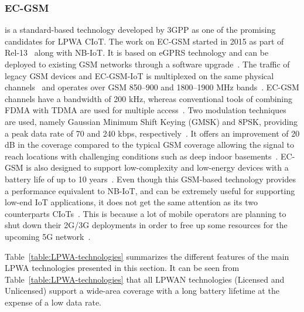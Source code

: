 \documentclass[]{IEEEtran}
\begin{document}
\subsubsection{EC-GSM}
\label{sec:2-2-3}
is a standard-based technology developed by 3GPP as one of the promising candidates for LPWA CIoT.
The work on EC-GSM started in 2015 as part of Rel-13~\cite{TR_45.820} along with NB-IoT.
It is based on eGPRS technology and can be deployed to existing GSM networks through a software upgrade~\cite{poursafar2017long}.
The traffic of legacy GSM devices and EC-GSM-IoT is multiplexed on the same physical channels~\cite{chaudhari2020lpwan} and operates over GSM 850–900 and 1800–1900 MHz bands~\cite{herrero_fundamentals_2021}.
EC-GSM channels have a bandwidth of 200 kHz, whereas conventional tools of combining FDMA with TDMA are used for multiple access~\cite{liberg_cellular_2019}.
Two modulation techniques are used, namely Gaussian Minimum Shift Keying (GMSK) and 8PSK, providing a peak data rate of 70 and 240 kbps, respectively~\cite{raza2017low}.
It offers an improvement of 20 dB in the coverage compared to the typical GSM coverage\cite{hwang_survey_2019} allowing the signal to reach locations with challenging conditions such as deep indoor basements~\cite{chaudhari2020lpwan}.
EC-GSM is also designed to support low-complexity and low-energy devices with a battery life of up to 10 years~\cite{poursafar2017long}.
Even though this GSM-based technology provides a performance equivalent to NB-IoT, and can be extremely useful for supporting low-end IoT applications, it does not get the same attention as its two counterparts CIoTs~\cite{foubert2020long}.
This is because a lot of mobile operators are planning to shut down their 2G/3G deployments in order to free up some resources for the upcoming 5G network~\cite{noauthor_complete_2019}.

Table~\ref{table:LPWA-technologies} summarizes the different features of the main LPWA technologies presented in this section.
It can be seen from Table~\ref{table:LPWA-technologies} that all LPWAN technologies (Licensed and Unlicensed) support a wide-area coverage with a long battery lifetime at the expense of a low data rate.
\end{document}
